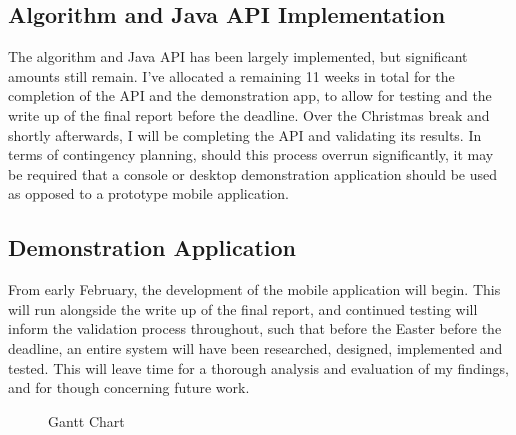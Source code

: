 \subsection{Algorithm and Java API Implementation}

The algorithm and Java API has been largely implemented, but significant amounts still remain. I've allocated a remaining 11 weeks in total for the completion of the API and the demonstration app, to allow for testing and the write up of the final report before the deadline. Over the Christmas break and shortly afterwards, I will be completing the API and validating its results. In terms of contingency planning, should this process overrun significantly, it may be required that a console or desktop demonstration application should be used as opposed to a prototype mobile application. 

\subsection{Demonstration Application}

From early February, the development of the mobile application will begin. This will run alongside the write up of the final report, and continued testing will inform the validation process throughout, such that before the Easter before the deadline, an entire system will have been researched, designed, implemented and tested. This will leave time for a thorough analysis and evaluation of my findings, and for though concerning future work. 


\begin{figure}[p]
    \caption{Gantt Chart}
\end{figure}


